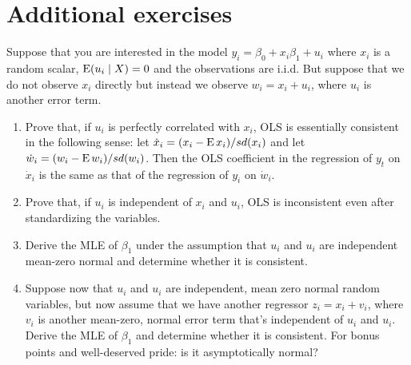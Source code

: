 

\section{Additional exercises}

\begin{hw}
  Suppose that you are interested in the model $y_i = \beta_0 +
  x_i\beta_1 + u_i$ where $x_i$ is a random scalar, $\operatorname{E}(u_i \mid X) =
  0$ and the observations are i.i.d. But suppose that we do not
  observe $x_i$ directly but instead we observe $w_i = x_i + u_i$,
  where $u_i$ is another error term.
  \begin{enumerate}
  \item Prove that, if $u_i$ is perfectly correlated with $x_i$, OLS
    is essentially consistent in the following sense: let $\dot x_i =
    (x_i - \operatorname{E} x_i) / sd(x_i)$ and let $\dot w_i = (w_i - \operatorname{E} w_i) /
    sd(w_i)$. Then the OLS coefficient in the regression of $y_t$ on
    $\dot x_i$ is the same as that of the regression of $y_i$ on $\dot
    w_i$.
  \item Prove that, if $u_i$ is independent of $x_i$ and $u_i$, OLS is
    inconsistent even after standardizing the variables.
  \item Derive the MLE of $\beta_1$ under the assumption that $u_i$ and
    $u_i$ are independent mean-zero normal and determine whether it is
    consistent.
  \item Suppose now that $u_i$ and $u_i$ are independent, mean zero
    normal random variables, but now assume that we have another
    regressor $z_i = x_i + v_i$, where $v_i$ is another mean-zero,
    normal error term that's independent of $u_i$ and $u_i$. Derive
    the MLE of $\beta_1$ and determine whether it is consistent. For bonus
    points and well-deserved pride: is it asymptotically normal?
  \end{enumerate}
\end{hw}


